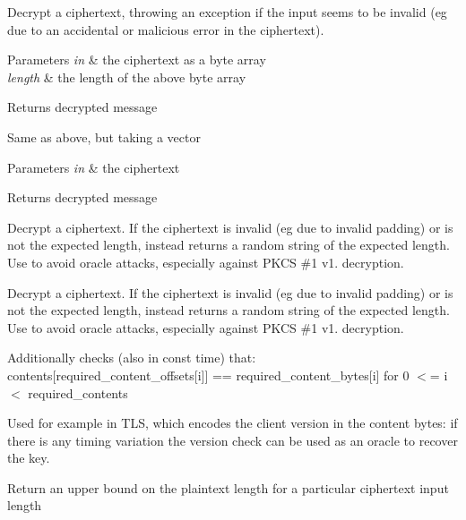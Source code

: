 Decrypt a ciphertext, throwing an exception if the input seems to be invalid (eg due to an accidental or malicious error in the ciphertext).


\begin{DoxyParams}{Parameters}
{\em in} & the ciphertext as a byte array \\
\hline
{\em length} & the length of the above byte array \\
\hline
\end{DoxyParams}
\begin{DoxyReturn}{Returns}
decrypted message
\end{DoxyReturn}
Same as above, but taking a vector 
\begin{DoxyParams}{Parameters}
{\em in} & the ciphertext \\
\hline
\end{DoxyParams}
\begin{DoxyReturn}{Returns}
decrypted message
\end{DoxyReturn}
Decrypt a ciphertext. If the ciphertext is invalid (eg due to invalid padding) or is not the expected length, instead returns a random string of the expected length. Use to avoid oracle attacks, especially against P\+K\+CS \#1 v1. decryption.

Decrypt a ciphertext. If the ciphertext is invalid (eg due to invalid padding) or is not the expected length, instead returns a random string of the expected length. Use to avoid oracle attacks, especially against P\+K\+CS \#1 v1. decryption.

Additionally checks (also in const time) that\+: contents\mbox{[}required\+\_\+content\+\_\+offsets\mbox{[}i\mbox{]}\mbox{]} == required\+\_\+content\+\_\+bytes\mbox{[}i\mbox{]} for 0 $<$= i $<$ required\+\_\+contents

Used for example in T\+LS, which encodes the client version in the content bytes\+: if there is any timing variation the version check can be used as an oracle to recover the key.

Return an upper bound on the plaintext length for a particular ciphertext input length


